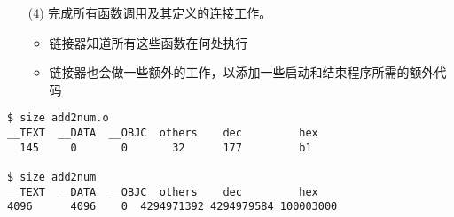 \begin{frame}[fragile]\ft{\secname}
\begin{itemize}
\item[(4)]  \quad 完成所有函数调用及其定义的连接工作。\\[.1in]

\begin{itemize}
	\item 链接器知道所有这些函数在何处执行 \\[.1in]
	\item 链接器也会做一些额外的工作，以添加一些启动和结束程序所需的额外代码 \\[.1in]
\end{itemize} 
\end{itemize}
\pause 


\begin{lstlisting}
$ size add2num.o
__TEXT  __DATA  __OBJC  others    dec         hex
  145     0       0       32      177         b1	
  
$ size add2num
__TEXT  __DATA  __OBJC  others    dec         hex
4096      4096    0  4294971392 4294979584 100003000
\end{lstlisting}

\end{frame}
